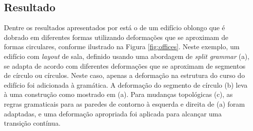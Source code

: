 \begin{figure}[h!]
	\centering
	\captionsetup{width=15cm}
	{}	
\end{figure}

\subsection{Resultado}
\label{sec:zmugg2014_sec5}

Dentre os resultados apresentados por  está o de um edifício oblongo que é dobrado em diferentes formas utilizando deformações que se aproximam de formas circulares, conforme ilustrado na Figura \ref{fig:offices}. Neste exemplo, um edifício com \textit{layout} de sala, definido usando uma abordagem de \textit{split grammar} (a), se adapta de acordo com diferentes deformações que se aproximam de segmentos de círculo ou círculos. Neste caso, apenas a deformação na estrutura do curso do edifício foi adicionada à gramática. A deformação do segmento de círculo (b) leva à uma construção como mostrado em (a). Para mudanças topológicas (c), as regras gramaticais para as paredes de contorno à esquerda e direita de (a) foram adaptadas, e uma deformação apropriada foi aplicada para alcançar uma transição contínua.

